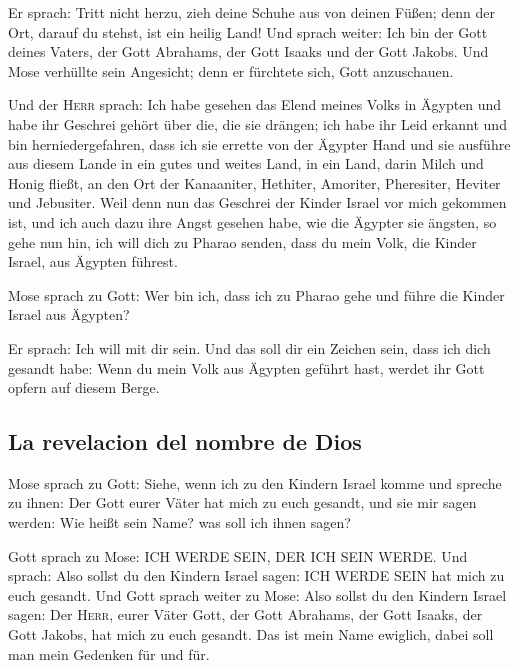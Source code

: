  Er sprach: Tritt nicht herzu, zieh deine Schuhe aus von
deinen Füßen; denn der Ort, darauf du stehst, ist ein heilig Land!
 Und sprach weiter: Ich bin der Gott deines Vaters, der
Gott Abrahams, der Gott Isaaks und der Gott Jakobs. Und Mose verhüllte
sein Angesicht; denn er fürchtete sich, Gott anzuschauen.

 Und der \textsc{Herr} sprach: Ich habe gesehen das Elend
meines Volks in Ägypten und habe ihr Geschrei gehört über die, die sie
drängen; ich habe ihr Leid erkannt  und bin
herniedergefahren, dass ich sie errette von der Ägypter Hand und sie
ausführe aus diesem Lande in ein gutes und weites Land, in ein Land,
darin Milch und Honig fließt, an den Ort der Kanaaniter, Hethiter,
Amoriter, Pheresiter, Heviter und Jebusiter.  Weil denn
nun das Geschrei der Kinder Israel vor mich gekommen ist, und ich auch
dazu ihre Angst gesehen habe, wie die Ägypter sie ängsten,
 so gehe nun hin, ich will dich zu Pharao senden, dass du
mein Volk, die Kinder Israel, aus Ägypten führest.

 Mose sprach zu Gott: Wer bin ich, dass ich zu Pharao
gehe und führe die Kinder Israel aus Ägypten?

 Er sprach: Ich will mit dir sein. Und das soll dir ein
Zeichen sein, dass ich dich gesandt habe: Wenn du mein Volk aus Ägypten
geführt hast, werdet ihr Gott opfern auf diesem Berge.

\hypertarget{la-revelacion-del-nombre-de-dios}{%
\subsection{La revelacion del nombre de
Dios}\label{la-revelacion-del-nombre-de-dios}}

 Mose sprach zu Gott: Siehe, wenn ich zu den Kindern
Israel komme und spreche zu ihnen: Der Gott eurer Väter hat mich zu euch
gesandt, und sie mir sagen werden: Wie heißt sein Name? was soll ich
ihnen sagen?

 Gott sprach zu Mose: ICH WERDE SEIN, DER ICH SEIN WERDE.
Und sprach: Also sollst du den Kindern Israel sagen: ICH WERDE SEIN hat
mich zu euch gesandt.  Und Gott sprach weiter zu Mose:
Also sollst du den Kindern Israel sagen: Der \textsc{Herr}, eurer Väter
Gott, der Gott Abrahams, der Gott Isaaks, der Gott Jakobs, hat mich zu
euch gesandt. Das ist mein Name ewiglich, dabei soll man mein Gedenken
für und für.


